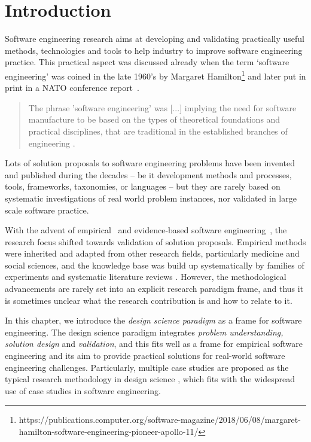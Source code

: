\documentclass[graybox]{svmult}
\begin{document}
\section{Introduction}
\label{sec:intro}


Software engineering research aims at developing and validating practically useful methods, technologies and tools to help industry to improve software engineering practice. This practical aspect was discussed already when the term `software engineering' was coined in the late 1960's by Margaret Hamilton\footnote{https://publications.computer.org/software-magazine/2018/06/08/margaret-hamilton-software-engineering-pioneer-apollo-11/} and later put in print in a NATO conference report~\cite{Nato1968}. 

\begin{quote}
{The phrase 'software engineering' was [...] implying the need for software manufacture to be based on the types of theoretical foundations and practical disciplines, that are traditional in the established branches of engineering} \cite[p13]{Nato1968}. 
\end{quote}

Lots of solution proposals to software engineering problems have been invented and published during the decades -- be it development methods and processes, tools, frameworks, taxonomies, or languages -- but they are rarely based on systematic investigations of real world problem instances, nor validated in large scale software practice.

With the advent of empirical~\cite{Basili86} and evidence-based software engineering~\cite{Kitchenham04}, the research focus shifted towards validation of solution proposals. Empirical methods were inherited and adapted from other research fields, particularly medicine and social sciences, and the knowledge base was build up systematically by families of experiments \cite{Basili99} and systematic literature reviews \cite{Kitchenham15}. However, the methodological advancements are rarely set into an explicit research paradigm frame, and thus it is sometimes unclear what the research contribution is and how to relate to it. 

In this chapter, we introduce the \emph{design science paradigm} as a frame for software engineering. The design science paradigm integrates \emph{problem understanding, solution design} and \emph{validation}, and this fits well as a frame for empirical software engineering and its aim to provide practical solutions for real-world software engineering challenges. Particularly, multiple case studies are proposed as the typical research methodology in design science \cite{van_aken_management_2004}, which fits with the widespread use of case studies in software engineering.
\end{document}
